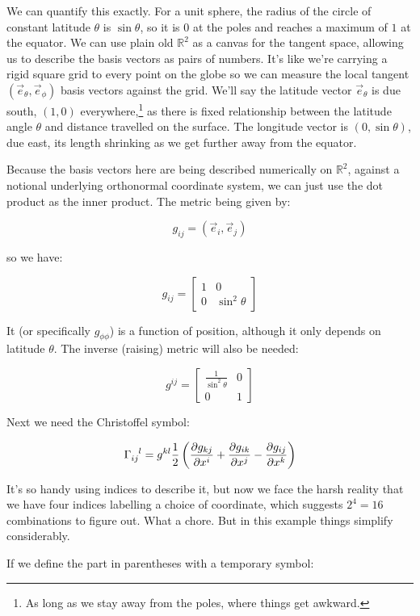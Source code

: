 We can quantify this exactly. For a unit sphere, the radius of the circle of constant latitude $\theta$ is $\sin \theta$, so it is $0$ at the poles and reaches a maximum of $1$ at the equator. We can use plain old $\mathbb{R}^2$ as a canvas for the tangent space, allowing us to describe the basis vectors as pairs of numbers. It's like we're carrying a rigid square grid to every point on the globe so we can measure the local tangent $(\vec{e}_{\theta}, \vec{e}_{\phi})$ basis vectors against the grid. We'll say the latitude vector $\vec{e}_{\theta}$ is due south, $(1, 0)$ everywhere,\footnote{As long as we stay away from the poles, where things get awkward.} as there is fixed relationship between the latitude angle $\theta$ and distance travelled on the surface. The longitude vector is $(0, \sin \theta)$, due east, its length shrinking as we get further away from the equator.

Because the basis vectors here are being described numerically on $\mathbb{R}^2$, against a notional underlying orthonormal coordinate system, we can just use the dot product as the inner product. The metric being given by:

$$
g_{ij} = (\vec{e}_i,\vec{e}_j)
$$

so we have:

$$
g_{ij} = \begin{bmatrix}1 & 0 \\ 0 & \sin^2 \theta\end{bmatrix} 
$$

It (or specifically $g_{\phi\phi}$) is a function of position, although it only depends on latitude $\theta$. The inverse (raising) metric will also be needed:

$$
g^{ij} = \begin{bmatrix}\frac{1}{\sin^2 \theta} & 0 \\ 0 & 1\end{bmatrix} 
$$

Next we need the Christoffel symbol:

$$
\Gamma\indices{_i_j^l}
=
g^{kl}
\frac{1}{2}
\left(
\frac{\partial g_{kj}}{\partial x^i} 
+
\frac{\partial g_{ik}}{\partial x^j} 
-
\frac{\partial g_{ij}}{\partial x^k} 
\right)
$$

It's so handy using indices to describe it, but now we face the harsh reality that we have four indices labelling a choice of coordinate, which suggests $2^4=16$ combinations to figure out. What a chore. But in this example things simplify considerably.

If we define the part in parentheses with a temporary symbol:

